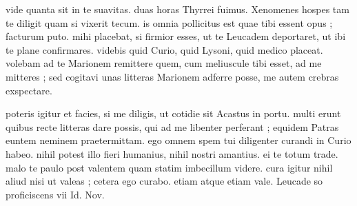 


 vide quanta sit in te suavitas. duas horas Thyrrei fuimus. Xenomenes hospes tam te diligit quam si vixerit tecum. is omnia pollicitus est quae tibi essent opus ; facturum puto. mihi placebat, si firmior esses, ut te Leucadem deportaret, ut ibi te plane confirmares. videbis quid Curio, quid Lysoni, quid medico placeat. volebam ad te Marionem remittere quem, cum meliuscule tibi esset, ad me mitteres ; sed cogitavi unas litteras Marionem adferre posse, me autem crebras exspectare.

 poteris igitur et facies, si me diligis, ut cotidie sit Acastus in portu. multi erunt quibus recte litteras dare possis, qui ad me libenter perferant ; equidem Patras euntem neminem praetermittam. ego omnem spem tui diligenter curandi in Curio habeo. nihil potest illo fieri humanius, nihil nostri amantius. ei te totum trade. malo te paulo post valentem quam statim imbecillum videre. cura igitur nihil aliud nisi ut valeas ; cetera ego curabo. etiam atque etiam vale. Leucade so proficiscens vii Id. Nov.

